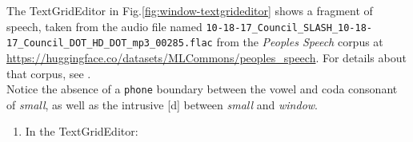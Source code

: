\documentclass[
]{book}
\providecommand{\tightlist}{%
  \setlength{\itemsep}{0pt}\setlength{\parskip}{0pt}}
\begin{document}
\label{box-windowsfile-details-third}
The TextGridEditor in Fig.\ref{fig:window-textgrideditor} shows a fragment of speech, taken from the audio file named \texttt{10-18-17\_Council\_SLASH\_10-18-17\_Council\_DOT\_HD\_DOT\_mp3\_00285.flac} from the \emph{Peoples Speech} corpus at \url{https://huggingface.co/datasets/MLCommons/peoples_speech}. For details about that corpus, see \citet{Galvez_Diamos_Ciro_Cerón_Achorn_Gopi_Kanter_Lam_Mazumder_Reddi_2021}.\\
Notice the absence of a \texttt{phone} boundary between the vowel and coda consonant of \emph{small}, as well as the intrusive {[}d{]} between \emph{small} and \emph{window}.

\begin{enumerate}
\def\labelenumi{(\arabic{enumi})}
\setcounter{enumi}{4}
\tightlist
\item
  In the TextGridEditor:\\
\end{enumerate}
\end{document}
